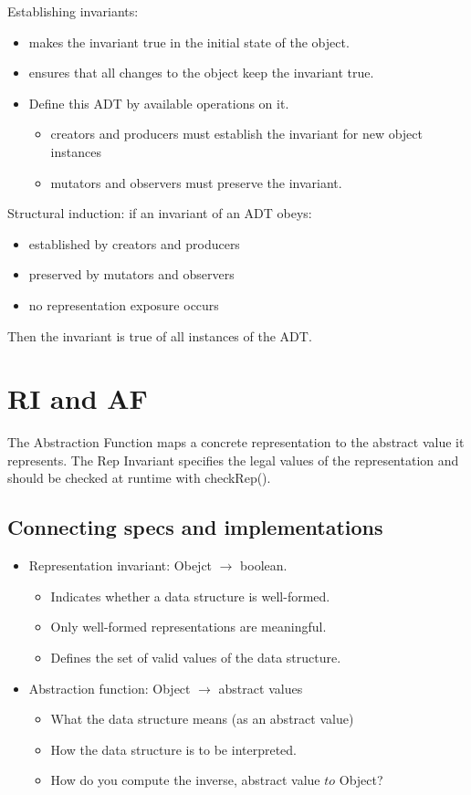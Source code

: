 \documentclass[letterpaper,12pt]{article}
\begin{document}
Establishing invariants:
\begin{itemize}
      \item makes the invariant true in the initial state of the object.
      \item ensures that all changes to the object keep the invariant true.
      \item Define this ADT by available operations on it.
            \begin{itemize}
                  \item creators and producers must establish the invariant for new object instances
                  \item mutators and observers must preserve the invariant.
            \end{itemize}
\end{itemize}
Structural induction: if an invariant of an ADT obeys:
\begin{itemize}
      \item established by creators and producers
      \item preserved by mutators and observers
      \item no representation exposure occurs
\end{itemize}
Then the invariant is true of all instances of the ADT.
\section{RI and AF}

The Abstraction Function maps a concrete representation to the abstract value
it represents. The Rep Invariant specifies the legal values of the representation
and should be checked at runtime with checkRep().

\subsection{Connecting specs and implementations}
\begin{itemize}
      \item Representation invariant: Obejct $\to$ boolean.
            \begin{itemize}
                  \item Indicates whether a data structure is well-formed.
                  \item Only well-formed representations are meaningful.
                  \item Defines the set of valid values of the data structure.
            \end{itemize}
      \item Abstraction function: Object $\to$ abstract values
            \begin{itemize}
                  \item What the data structure means (as an abstract value)
                  \item How the data structure is to be interpreted.
                  \item How do you compute the inverse, abstract value $to$ Object?
            \end{itemize}
\end{itemize}
\end{document}
